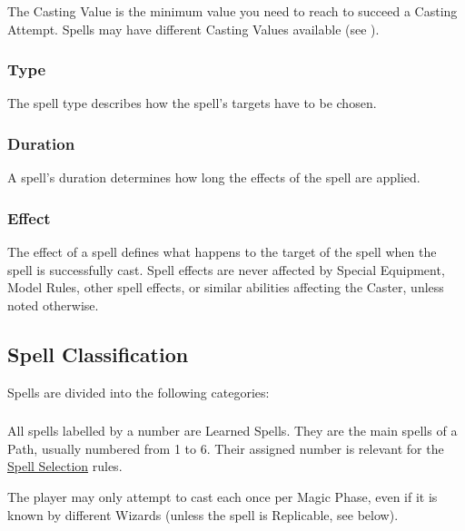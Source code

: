 The Casting Value is the minimum value you need to reach to succeed a Casting Attempt. Spells may have different Casting Values available (see ).

\subsubsection{Type}

The spell type describes how the spell's targets have to be chosen.

\subsubsection{Duration}

A spell's duration determines how long the effects of the spell are applied.

\subsubsection{Effect}

The effect of a spell defines what happens to the target of the spell when the spell is successfully cast. Spell effects are never affected by Special Equipment, Model Rules, other spell effects, or similar abilities affecting the Caster, unless noted otherwise.

\subsection{Spell Classification}
\label{spell_classification}

Spells are divided into the following categories:

\subsubsection{\learnedspells}
\label{learned_spells}

All spells labelled by a number are Learned Spells. They are the main spells of a Path, usually numbered from 1 to 6. Their assigned number is relevant for the \hyperref[spell_selection]{Spell Selection} rules.

The player may only attempt to cast each \learnedspell{} once per Magic Phase, even if it is known by different Wizards (unless the spell is Replicable, see below).

\subsubsection{\hereditaryspells}
\label{hereditary_spells}

